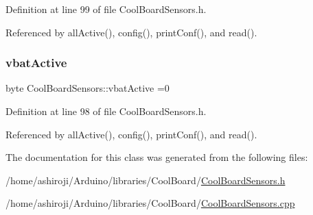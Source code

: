 Definition at line 99 of file Cool\+Board\+Sensors.\+h.



Referenced by all\+Active(), config(), print\+Conf(), and read().

\mbox{\label{classCoolBoardSensors_af5039ad760b0ff0aa7eee16c55e81702}} 
\subsubsection{\texorpdfstring{vbat\+Active}{vbatActive}}
{\footnotesize\ttfamily byte Cool\+Board\+Sensors\+::vbat\+Active =0\hspace{0.3cm}{\ttfamily [private]}}



Definition at line 98 of file Cool\+Board\+Sensors.\+h.



Referenced by all\+Active(), config(), print\+Conf(), and read().



The documentation for this class was generated from the following files\+:\begin{DoxyCompactItemize}
\item 
/home/ashiroji/\+Arduino/libraries/\+Cool\+Board/\hyperlink{CoolBoardSensors_8h}{Cool\+Board\+Sensors.\+h}\item 
/home/ashiroji/\+Arduino/libraries/\+Cool\+Board/\hyperlink{CoolBoardSensors_8cpp}{Cool\+Board\+Sensors.\+cpp}\end{DoxyCompactItemize}
